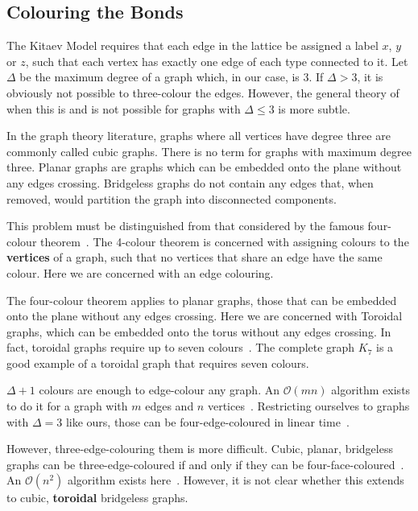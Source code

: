 \hypertarget{colouring-the-bonds}{%
\subsection{Colouring the Bonds}\label{colouring-the-bonds}}

The Kitaev Model requires that each edge in the lattice be assigned a label \(x\), \(y\) or \(z\), such that each vertex has exactly one edge of each type connected to it. Let \(\Delta\) be the maximum degree of a graph which, in our case, is 3. If \(\Delta > 3\), it is obviously not possible to three-colour the edges. However, the general theory of when this is and is not possible for graphs with \(\Delta \leq 3\) is more subtle.

In the graph theory literature, graphs where all vertices have degree three are commonly called cubic graphs. There is no term for graphs with maximum degree three. Planar graphs are graphs which can be embedded onto the plane without any edges crossing. Bridgeless graphs do not contain any edges that, when removed, would partition the graph into disconnected components.

This problem must be distinguished from that considered by the famous four-colour theorem~\autocite{appelEveryPlanarMap1989}. The 4-colour theorem is concerned with assigning colours to the \textbf{vertices} of a graph, such that no vertices that share an edge have the same colour. Here we are concerned with an edge colouring.

The four-colour theorem applies to planar graphs, those that can be embedded onto the plane without any edges crossing. Here we are concerned with Toroidal graphs, which can be embedded onto the torus without any edges crossing. In fact, toroidal graphs require up to seven colours~\autocite{heawoodMapColouringTheorems}. The complete graph \(K_7\) is a good example of a toroidal graph that requires seven colours.

\(\Delta + 1\) colours are enough to edge-colour any graph. An \(\mathcal{O}(mn)\) algorithm exists to do it for a graph with \(m\) edges and \(n\) vertices~\autocite{gEstimateChromaticClass1964}. Restricting ourselves to graphs with \(\Delta = 3\) like ours, those can be four-edge-coloured in linear time~\autocite{skulrattanakulchai4edgecoloringGraphsMaximum2002}.

However, three-edge-colouring them is more difficult. Cubic, planar, bridgeless graphs can be three-edge-coloured if and only if they can be four-face-coloured~\autocite{tait1880remarks}. An \(\mathcal{O}(n^2)\) algorithm exists here~\autocite{robertson1996efficiently}. However, it is not clear whether this extends to cubic, \textbf{toroidal} bridgeless graphs.

